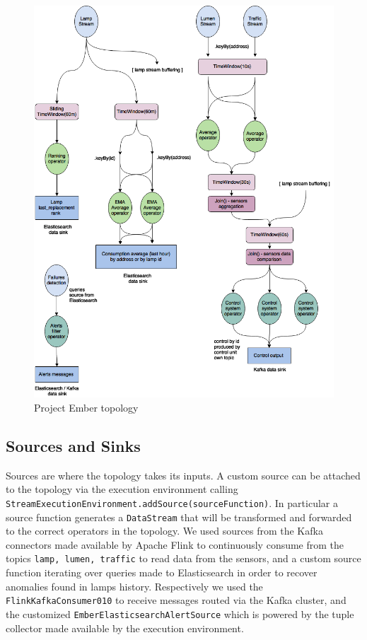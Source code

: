 \begin{figure}
\begin{center}
	\includegraphics[scale=0.3]{img/ember_topology}
	\caption{Project Ember topology}
	\label{fig:ember_topology}
\end{center}
\end{figure}


\subsection{Sources and Sinks}
Sources are where the topology takes its inputs. A custom source can be attached to the topology via the execution environment calling \texttt{StreamExecutionEnvironment.addSource(sourceFunction)}. In particular a source function generates a \texttt{DataStream} that will be transformed and forwarded to the correct operators in the topology. We used sources from the Kafka connectors made available by Apache Flink to continuously consume from the topics \texttt{lamp, lumen, traffic} to read data from the sensors, and a custom source function iterating over queries made to Elasticsearch in order to recover anomalies found in lamps history. Respectively we used the \texttt{FlinkKafkaConsumer010} to receive messages routed via the Kafka cluster, and the customized \texttt{EmberElasticsearchAlertSource} which is powered by the tuple collector made available by the execution environment.

